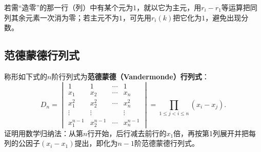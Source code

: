 若需“造零”的那一行（列）中有某个元为$1$，就以它为主元，用$r_i-r_1$等运算把同列其余元素一次消为零；若主元不为$1$，可先用$r_i(k)$把它化为$1$，避免出现分数。

\subsection{范德蒙德行列式}

称形如下式的$n$阶行列式为\textbf{范德蒙德（Vandermonde）行列式}：
\[
D_n=\begin{vmatrix}
1&1&\cdots&1\\
x_1&x_2&\cdots&x_n\\
x_1^2&x_2^2&\cdots&x_n^2\\
\vdots&\vdots&&\vdots\\
x_1^{n-1}&x_2^{n-1}&\cdots&x_n^{n-1}
\end{vmatrix}
=\prod_{1\le j<i\le n}(x_i-x_j).
\]
证明用数学归纳法：从第$n$行开始，后行减去前行的$x_1$倍，再按第1列展开并把每列的公因子$(x_i-x_1)$提出，即化为$n-1$阶范德蒙德行列式。

